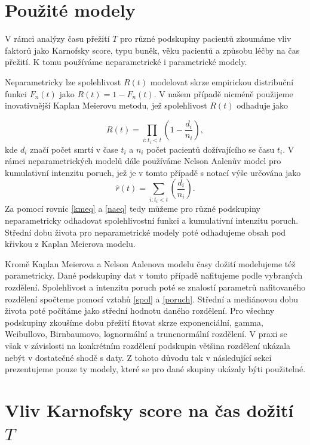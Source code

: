 \documentclass[10pt]{article}
\begin{document}
\section{Použité modely}

V rámci analýzy času přežití $T$ pro různé podskupiny pacientů zkoumáme vliv faktorů jako Karnofsky score, typu buněk, věku pacientů a způsobu léčby na čas přežití. K tomu používáme neparametrické i parametrické modely.

Neparametricky lze spolehlivost $R(t)$ modelovat skrze empirickou distribuční funkci $F_n(t)$ jako $R(t)=1-F_n(t)$. V našem případě nicméně použijeme inovativnější Kaplan Meierovu metodu, jež spolehlivost $R(t)$ odhaduje jako

\begin{equation}\label{kmeq}
R(t) = \prod_{i: t_i < t} \left(1-\frac{d_i}{n_i}\right),
\end{equation}
kde $d_i$ značí počet smrtí v čase $t_i$ a $n_i$ počet pacientů dožívajícího se času $t_i$. V rámci neparametrických modelů dále používáme Nelson Aalenův model pro kumulativní intenzitu poruch, jež je v tomto případě s notací výše určována jako    
\begin{equation}\label{naeq}
\hat{r}(t) = \sum_{i: t_i < t} \left(\frac{d_i}{n_i}\right).
\end{equation}
Za pomocí rovnic \eqref{kmeq} a \eqref{naeq} tedy můžeme pro různé podskupiny neparametricky odhadovat spolehlivostní funkci a kumulativní intenzitu poruch. Střední dobu života pro neparametrické modely poté odhadujeme obsah pod křivkou z Kaplan Meierova modelu.

Kromě Kaplan Meierova a Nelson Aalenova modelu časy dožití modelujeme též parametricky. Dané podskupiny dat v tomto případě nafitujeme podle vybraných rozdělení. Spolehlivost a intenzitu poruch poté se znalostí parametrů nafitovaného rozdělení spočteme pomocí vztahů \eqref{spol} a \eqref{poruch}. Střední a mediánovou dobu života poté počítáme jako střední hodnotu daného rozdělení. Pro všechny podskupiny zkoušíme dobu přežití fitovat skrze exponenciální, gamma, Weibullovo, Birnbaumovo, lognormální a truncnormální rozdělení. V praxi se však v závislosti na konkrétním rozdělení podskupin většina rozdělení ukázala nebýt v dostatečné shodě s daty. Z tohoto důvodu tak v následující sekci prezentujeme pouze ty modely, které se pro dané skupiny ukázaly býti použitelné. 
    
\section{Vliv Karnofsky score na čas dožití $T$}
\end{document}
